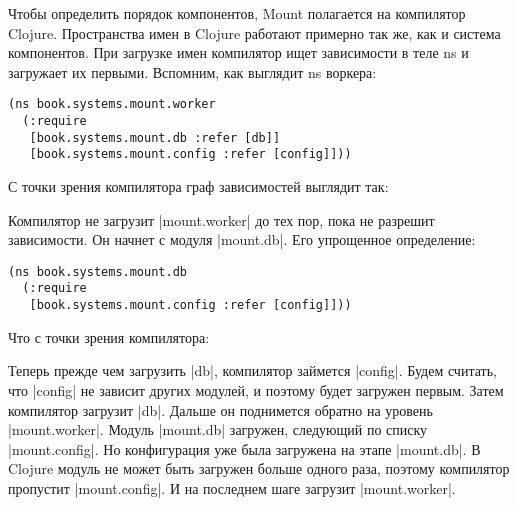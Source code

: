 Чтобы определить порядок компонентов, Mount полагается на компилятор
Clojure. Пространства имен в Clojure работают примерно так же, как и система
компонентов. При загрузке имен компилятор ищет зависимости в теле ns и загружает
их первыми. Вспомним, как выглядит ns воркера:

\begin{verbatim}
(ns book.systems.mount.worker
  (:require
   [book.systems.mount.db :refer [db]]
   [book.systems.mount.config :refer [config]]))
\end{verbatim}

С точки зрения компилятора граф зависимостей выглядит так:

\vspace{1em}


\vspace{1em}

Компилятор не загрузит \spverb|mount.worker| до тех пор, пока не разрешит
зависимости. Он начнет с модуля \spverb|mount.db|. Его упрощенное определение:

\begin{verbatim}
(ns book.systems.mount.db
  (:require
   [book.systems.mount.config :refer [config]]))
\end{verbatim}

Что с точки зрения компилятора:

\vspace{1em}


\vspace{1em}

Теперь прежде чем загрузить \spverb|db|, компилятор займется \spverb|config|. Будем считать,
что \spverb|config| не зависит других модулей, и поэтому будет загружен первым. Затем
компилятор загрузит \spverb|db|. Дальше он поднимется обратно на уровень
\spverb|mount.worker|. Модуль \spverb|mount.db| загружен, следующий по списку
\spverb|mount.config|. Но конфигурация уже была загружена на этапе \spverb|mount.db|. В
Clojure модуль не может быть загружен больше одного раза, поэтому компилятор
пропустит \spverb|mount.config|. И на последнем шаге загрузит \spverb|mount.worker|.

